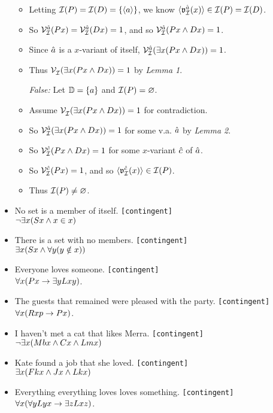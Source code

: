 \documentclass[a4paper, 11pt]{article} %
\begin{document}
\begin{itemize}
\begin{itemize}
      \item Letting $\mathcal{I}(P)=\mathcal{I}(D)=\lbrace\langle a\rangle\rbrace$, we know $\langle\mathfrak{v}_{\mathcal{I}}^{\hat{a}}(x)\rangle\in\mathcal{I}(P)=\mathcal{I}(D)$.
      \item So $\mathcal{V}_{\mathcal{I}}^{\hat{a}}(Px)=\mathcal{V}_{\mathcal{I}}^{\hat{a}}(Dx)=1$, and so $\mathcal{V}_{\mathcal{I}}^{\hat{a}}(Px \wedge Dx)=1$.
      \item Since $\hat{a}$ is a $x$-variant of itself, $\mathcal{V}_{\mathcal{I}}^{\hat{a}}(\exists x(Px \wedge Dx))=1$.
      \item Thus $\mathcal{V}_{\mathcal{I}}^{}(\exists x(Px \wedge Dx))=1$ by \textit{Lemma 1}.
      \item[\it False:] Let $\mathbb{D}=\lbrace a\rbrace$ and $\mathcal{I}(P)=\varnothing$.
      \item Assume $\mathcal{V}_{\mathcal{I}}^{}(\exists x(Px \wedge Dx))=1$ for contradiction.
      \item So $\mathcal{V}_{\mathcal{I}}^{\hat{a}}(\exists x(Px \wedge Dx))=1$ for some v.a. $\hat{a}$ by \textit{Lemma 2}.
      \item So $\mathcal{V}_{\mathcal{I}}^{\hat{c}}(Px \wedge Dx)= 1$ for some $x$-variant $\hat{c}$ of $\hat{a}$.
      \item So $\mathcal{V}_{\mathcal{I}}^{\hat{c}}(Px)= 1$, and so $\langle\mathfrak{v}_{\mathcal{I}}^{\hat{c}}(x)\rangle\in\mathcal{I}(P)$.
      \item Thus $\mathcal{I}(P)\neq\varnothing$.
    \end{itemize}
  \item No set is a member of itself. \quad \texttt{[contingent]}\\
    $\neg\exists x(Sx \wedge x\in x)$
  \item There is a set with no members. \quad \texttt{[contingent]}\\
    $\exists x(Sx \wedge \forall y(y\notin x))$
  \item Everyone loves someone. \quad \texttt{[contingent]}\\ 
    $\forall x(Px \rightarrow \exists yLxy)$.
  \item The guests that remained were pleased with the party. \quad \texttt{[contingent]}\\  
    $\forall x(Rxp \rightarrow Px)$.
  \item I haven't met a cat that likes Merra. \quad \texttt{[contingent]}\\
    $\neg\exists x(Mbx \wedge Cx \wedge Lmx)$
  \item Kate found a job that she loved. \quad \texttt{[contingent]}\\
    $\exists x(Fkx \wedge Jx \wedge Lkx)$
  \item Everything everything loves loves something. \quad \texttt{[contingent]}\\  
    $\forall x(\forall yLyx \rightarrow \exists zLxz)$.
\end{itemize}
\end{document}
